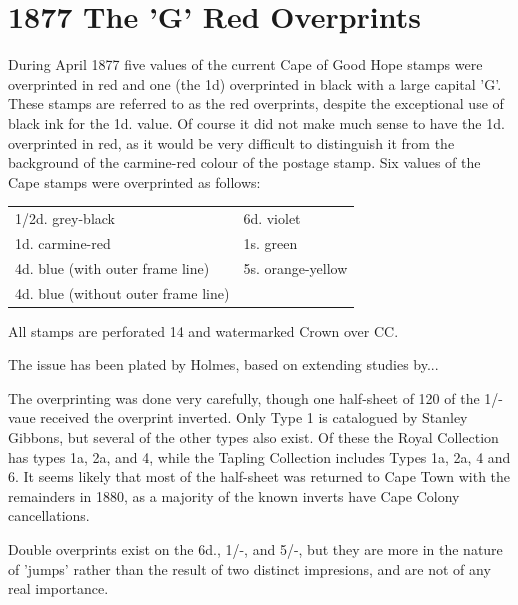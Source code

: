 \chapter{1877 The 'G' Red Overprints}    

During April 1877 five values of the current Cape of Good Hope stamps were  overprinted in red and one (the 1d) overprinted in black with a large capital 'G'. These stamps are referred to as the red overprints, despite the exceptional use of black ink for the 1d. value. Of course it did not make much sense to have the 1d. overprinted in red, as it would be very difficult to distinguish it from the background of the carmine-red colour of the postage stamp. Six values of the Cape stamps were overprinted as follows:

\begin{tabular}{ll}
1/2d. grey-black & 6d. violet\\
1d. carmine-red & 1s. green\\
4d. blue (with outer frame line) &5s. orange-yellow\\
4d. blue (without outer frame line)\\
\end{tabular}

All stamps are perforated 14 and watermarked Crown over CC.

The issue has been plated by Holmes, based on extending studies by...


The overprinting was done very carefully, though one half-sheet of 120 of the 1/- vaue received the overprint inverted. Only Type 1 is catalogued by Stanley Gibbons, but several of the other types also exist. Of these the Royal Collection has types 1a, 2a, and 4, while the Tapling Collection includes Types 1a, 2a, 4 and 6. It seems likely that most of the half-sheet was returned to Cape Town with the remainders in 1880, as a majority of the known inverts have Cape Colony cancellations.

Double overprints exist on the 6d., 1/-, and 5/-, but they are more in the nature of
'jumps' rather than the result of two distinct impresions, and are not of any real importance.


